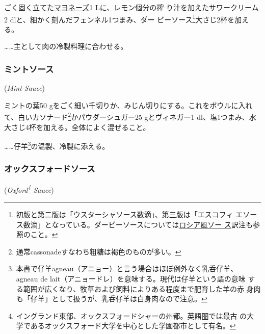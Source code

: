 \begin{recette}
ごく固く立てた\protect\hyperlink{mayonnaise}{マヨネーズ}1
Lに、レモン\undemi{}個分の搾 り汁を加えたサワークリーム2
dlと、細かく刻んだフェンネル1つまみ、ダー ビーソース\footnote{初版と第二版は「ウスターシャソース数滴」、第三版は「エスコフィ
  エソース数滴」となっている。ダービーソースについては\protect\hyperlink{sauce-russe-froide}{ロシア風ソー
  ス}訳注も参照のこと。}大さじ2杯を加える。

\ldots{}\ldots{}主として肉の冷製料理に合わせる。

\maeaki

\hypertarget{mint-sauce}{%
\subsubsection{ミントソース}\label{mint-sauce}}

 (\emph{Mint-Sauce})


ミントの葉50
gをごく細い千切りか、みじん切りにする。これをボウルに入れて、白いカソナード\footnote{通常cassonadeすなわち粗糖は褐色のものが多い。}かパウダーシュガー25
gとヴィネガー1\undemi{}
dl、塩1つまみ、水大さじ4杯を加える。全体によく混ぜること。

\ldots{}\ldots{}仔羊\footnote{本書で仔羊agneau（アニョー）と言う場合はほぼ例外なく乳呑仔羊、
  agneau de lait（アニョードレ）を意味する。現代は仔羊という語の意味
  する範囲が広くなり、牧草および飼料によりある程度まで肥育した羊の赤
  身肉も「仔羊」として扱うが、乳呑仔羊は白身肉なので注意。}の温製、冷製に添える。

\maeaki

\hypertarget{oxford-sauce}{%
\subsubsection{オックスフォードソース}\label{oxford-sauce}}

 (\emph{Oxford\footnote{イングランド東部、オックスフォードシャーの州都。英語圏では最古
  の大学であるオックスフォード大学を中心とした学園都市として有名。}
Sauce})


\end{recette}
